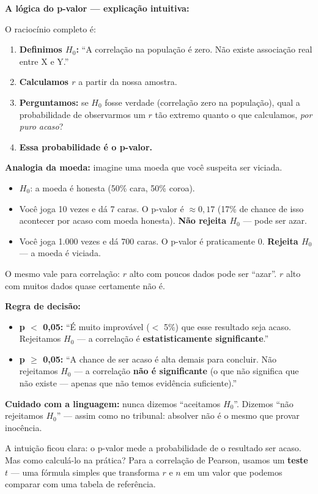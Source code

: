 \begin{SolvedBox}
\textbf{A lógica do p-valor — explicação intuitiva:}

O raciocínio completo é:
\begin{enumerate}
  \item \textbf{Definimos $H_0$:} ``A correlação na população é zero.
  Não existe associação real entre X e Y.''
  \item \textbf{Calculamos $r$} a partir da nossa amostra.
  \item \textbf{Perguntamos:} se $H_0$ fosse verdade (correlação zero na
  população), qual a probabilidade de observarmos um $r$ tão extremo
  quanto o que calculamos, \emph{por puro acaso}?
  \item \textbf{Essa probabilidade é o p-valor.}
\end{enumerate}

\textbf{Analogia da moeda:} imagine uma moeda que você suspeita ser viciada.
\begin{itemize}
  \item $H_0$: a moeda é honesta (50\% cara, 50\% coroa).
  \item Você joga 10 vezes e dá 7 caras.
  O p-valor é $\approx 0{,}17$ (17\% de chance de isso acontecer por acaso
  com moeda honesta). \textbf{Não rejeita $H_0$} — pode ser azar.
  \item Você joga 1.000 vezes e dá 700 caras.
  O p-valor é praticamente 0. \textbf{Rejeita $H_0$} — a moeda é viciada.
\end{itemize}

O mesmo vale para correlação: $r$ alto com poucos dados pode ser ``azar''.
$r$ alto com muitos dados quase certamente não é.

\textbf{Regra de decisão:}
\begin{itemize}
  \item \textbf{p $<$ 0,05:} ``É muito improvável ($<$ 5\%) que esse resultado
  seja acaso. Rejeitamos $H_0$ — a correlação é \textbf{estatisticamente
  significante}.''
  \item \textbf{p $\geq$ 0,05:} ``A chance de ser acaso é alta demais para
  concluir. Não rejeitamos $H_0$ — a correlação \textbf{não é significante}
  (o que não significa que não existe — apenas que não temos evidência
  suficiente).''
\end{itemize}

\textbf{Cuidado com a linguagem:} nunca dizemos ``aceitamos $H_0$''.
Dizemos ``não rejeitamos $H_0$'' — assim como no tribunal: absolver não
é o mesmo que provar inocência.
\end{SolvedBox}
A intuição ficou clara: o p-valor mede a probabilidade de o resultado
ser acaso.
Mas como calculá-lo na prática?
Para a correlação de Pearson, usamos um \textbf{teste~$t$} — uma fórmula
simples que transforma $r$ e $n$ em um valor que podemos comparar com
uma tabela de referência.

